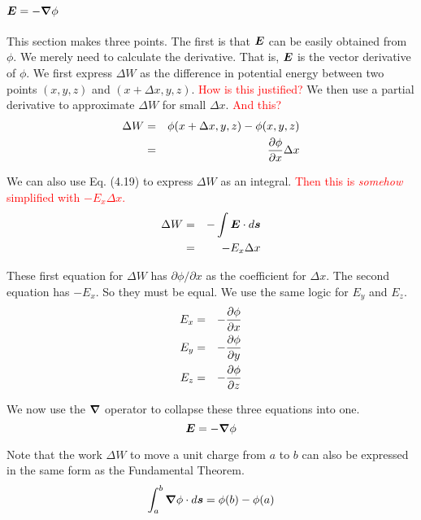 \section{$\boldsymbol{E} = - \boldsymbol{\nabla} \phi$}

This section makes three points.
The first is that $\boldsymbol{E}$ can be easily obtained from $\phi$.
We merely need to calculate the derivative.
That is, $\boldsymbol{E}$ is the vector derivative of $\phi$.
We first express $\Delta W$ as the difference in potential energy
between two points $(x,y,z)$ and $(x+\Delta x,y,z)$.
\textcolor{red}{How is this justified?}
We then use a partial derivative to approximate $\Delta W$ for small $\Delta x$.
\textcolor{red}{And this?}
\begin{eqnarray*}
  \Delta W &=& \phi(x + \Delta x, y, z) - \phi(x,y,z) \\
  &=& \frac{\partial \phi}{\partial x} \Delta x
\end{eqnarray*}

We can also use Eq. (4.19) to express $\Delta W$ as an integral.
\textcolor{red}{Then this is \emph{somehow} simplified with $- E_x \Delta x$.}
\begin{eqnarray*}
  \Delta W &=& - \int \boldsymbol{E} \cdot d\boldsymbol{s} \\
  &=& -E_x \Delta x
\end{eqnarray*}

These first equation for $\Delta W$ has $\partial \phi/\partial x$ as the coefficient for $\Delta x$.
The second equation has $-E_x$. So they must be equal.
We use the same logic for $E_y$ and $E_z$.
\begin{eqnarray}
  E_x &=& - \frac{\partial \phi}{\partial x} \\
  E_y &=& - \frac{\partial \phi}{\partial y} \nonumber\\
  E_z &=& - \frac{\partial \phi}{\partial z} \nonumber
\end{eqnarray}

We now use the $\boldsymbol{\nabla}$ operator to collapse these three equations into one.
\begin{equation}
  \boldsymbol{E} = - \boldsymbol{\nabla} \phi
\end{equation}

Note that the work $\Delta W$ to move a unit charge from $a$ to $b$
can also be expressed in the same form as the Fundamental Theorem.
\begin{equation}
  \int_a^b \boldsymbol{\nabla} \phi \cdot d\boldsymbol{s} = \phi(b) - \phi(a)
\end{equation}

